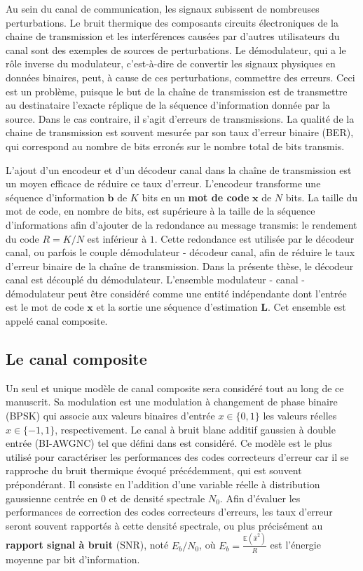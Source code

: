 Au sein du canal de communication, les signaux subissent de nombreuses perturbations. Le bruit thermique des composants circuits électroniques de la chaine de transmission et les interférences causées par d'autres utilisateurs du canal sont des exemples de sources de perturbations. Le démodulateur, qui a le rôle inverse du modulateur, c'est-à-dire de convertir les signaux physiques en données binaires, peut, à cause de ces perturbations, commettre des erreurs. Ceci est un problème, puisque le but de la chaîne de transmission est de transmettre au destinataire l'exacte réplique de la séquence d'information donnée par la source. Dans le cas contraire, il s'agit d'erreurs de transmissions. La qualité de la chaine de transmission est souvent mesurée par son taux d'erreur binaire (BER), qui correspond au nombre de bits erronés sur le nombre total de bits transmis.

L'ajout d'un encodeur et d'un décodeur canal dans la chaîne de transmission est un moyen efficace de réduire ce taux d'erreur. L'encodeur transforme une séquence d'information $\mathbold{b}$ de $K$ bits en un \textbf{mot de code} $\mathbold{x}$ de $N$ bits. La taille du mot de code, en nombre de bits, est supérieure à la taille de la séquence d'informations afin d'ajouter de la redondance au message transmis: le rendement du code $R=K/N$ est inférieur à $1$. Cette redondance est utilisée par le décodeur canal, ou parfois le couple démodulateur - décodeur canal, afin de réduire le taux d'erreur binaire de la chaîne de transmission. Dans la présente thèse, le décodeur canal est découplé du démodulateur. L'ensemble modulateur - canal - démodulateur peut être considéré comme une entité indépendante dont l'entrée est le mot de code $\mathbold{x}$ et la sortie une séquence d'estimation $\mathbold{L}$. Cet ensemble est appelé canal composite.

\subsection{Le canal composite}
Un seul et unique modèle de canal composite sera considéré tout au long de ce manuscrit. Sa modulation est une modulation à changement de phase binaire (BPSK) qui associe aux valeurs binaires d'entrée $x\in\{0,1\}$ les valeurs réelles $\hat{x}\in\{-1,1\}$, respectivement.
Le canal à bruit blanc additif gaussien à double entrée (BI-AWGNC) tel que défini dans \cite[Section~1.5.1.3]{ryan2009channel} est considéré. Ce modèle est le plus utilisé pour caractériser les performances des codes correcteurs d'erreur car il se rapproche du bruit thermique évoqué précédemment, qui est souvent prépondérant. Il consiste en l'addition d'une variable réelle à distribution gaussienne centrée en $0$ et de densité spectrale $N_0$. Afin d'évaluer les performances de correction des codes correcteurs d'erreurs, les taux d'erreur seront souvent rapportés à cette densité spectrale, ou plus précisément au \textbf{rapport signal à bruit} (SNR), noté $E_b/N_0$, où $E_b=\frac{\mathbb{E}(\hat{x}^2)}{R}$ est l'énergie moyenne par bit d'information.

